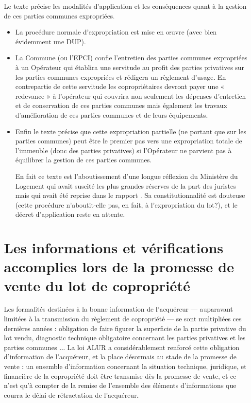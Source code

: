 		\par Le texte précise les modalités d’application et les conséquences quant à la gestion de ces parties
		communes expropriées.
		\begin{itemize}
			\item  La procédure normale d’expropriation est mise en œuvre (avec bien évidemment une DUP).
			
			\item  La Commune (ou l’EPCI) confie l’entretien des parties communes expropriées à un Opérateur qui
			établira une servitude au profit des parties privatives sur les parties communes expropriées et
			rédigera un règlement d’usage. En contrepartie de cette servitude les copropriétaires devront
			payer une « redevance » à l’opérateur qui couvrira non seulement les dépenses d’entretien et de
			conservation de ces parties communes mais également les travaux d’amélioration de ces parties
			communes et de leurs équipements.
			
			\item  Enfin le texte précise que cette expropriation partielle (ne portant que sur les parties communes)
			peut être le premier pas vers une expropriation totale de l’immeuble (donc des parties privatives)
			si l’Opérateur ne parvient pas à équilibrer la gestion de ces parties communes.
			
			En fait ce texte est l’aboutissement d’une longue réflexion du Ministère du Logement qui avait suscité les
			plus grandes réserves de la part des juristes mais qui avait été reprise dans le rapport . Sa
			constitutionnalité est douteuse (cette procédure n’aboutit-elle pas, en fait, à l’expropriation du lot?), et le
			décret d’application reste en attente.
		\end{itemize}
	
\section[Lors de la promesse de vente]{Les informations et vérifications accomplies lors de la promesse de vente du lot de copropriété}

	Les formalités destinées à la bonne information de l’acquéreur --- auparavant limitées à la transmission du
	règlement de copropriété --- se sont multipliées ces dernières années : obligation de faire figurer la
	superficie de la partie privative du lot vendu, diagnostic technique obligatoire concernant les parties
	privatives et les parties communes $\dots$
	La loi ALUR a considérablement renforcé cette obligation
	d’information de l’acquéreur, et la place désormais au stade de la promesse de vente : un ensemble
	d’information concernant la situation technique, juridique, et financière de la copropriété doit être
	transmise dès la promesse de vente, et ce n’est qu’à compter de la remise de l’ensemble des éléments
	d’informations que courra le délai de rétractation de l’acquéreur.
	
